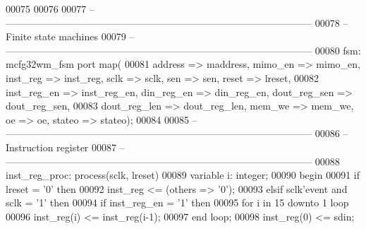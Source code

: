 \begin{DoxyCode}
00075 
00076 
00077 \textcolor{keyword}{    -- ---------------------------------------------------------------------------------------------}
00078 \textcolor{keyword}{    -- Finite state machines}
00079 \textcolor{keyword}{    -- ---------------------------------------------------------------------------------------------}
00080     fsm: mcfg32wm_fsm \textcolor{keywordflow}{port} \textcolor{keywordflow}{map}( 
00081         address => maddress, mimo_en => mimo_en, inst_reg => inst_reg, sclk => 
      sclk, sen => sen, reset => lreset,
00082         inst_reg_en => inst_reg_en, din_reg_en => din_reg_en, dout_reg_sen => 
      dout_reg_sen,
00083         dout_reg_len => dout_reg_len, mem_we => mem_we, oe => oe, stateo => 
      stateo\textcolor{vhdlchar}{)};
00084         
00085 \textcolor{keyword}{    -- ---------------------------------------------------------------------------------------------}
00086 \textcolor{keyword}{    -- Instruction register}
00087 \textcolor{keyword}{    -- ---------------------------------------------------------------------------------------------}
00088     inst\_reg\_proc: \textcolor{keywordflow}{process}(sclk, lreset)
00089         \textcolor{keywordflow}{variable} \textcolor{vhdlchar}{i}\textcolor{vhdlchar}{:} \textcolor{comment}{integer};
00090 \textcolor{vhdlkeyword}{    begin}
00091         \textcolor{keywordflow}{if} \textcolor{vhdlchar}{lreset} \textcolor{vhdlchar}{=} \textcolor{vhdlchar}{'}\textcolor{vhdllogic}{}\textcolor{vhdllogic}{0}\textcolor{vhdlchar}{'} \textcolor{keywordflow}{then}
00092             inst\_reg <= (\textcolor{keywordflow}{others} => '0');
00093         \textcolor{keywordflow}{elsif} \textcolor{vhdlchar}{sclk}\textcolor{vhdlchar}{'}\textcolor{vhdlkeyword}{event} \textcolor{keywordflow}{and} \textcolor{vhdlchar}{sclk} \textcolor{vhdlchar}{=} \textcolor{vhdlchar}{'}\textcolor{vhdllogic}{}\textcolor{vhdllogic}{1}\textcolor{vhdlchar}{'} \textcolor{keywordflow}{then}
00094             \textcolor{keywordflow}{if} \textcolor{vhdlchar}{inst_reg_en} \textcolor{vhdlchar}{=} \textcolor{vhdlchar}{'}\textcolor{vhdllogic}{}\textcolor{vhdllogic}{1}\textcolor{vhdlchar}{'} \textcolor{keywordflow}{then}
00095                 \textcolor{keywordflow}{for} \textcolor{vhdlchar}{i} \textcolor{keywordflow}{in} \textcolor{vhdllogic}{}\textcolor{vhdllogic}{15} \textcolor{keywordflow}{downto} \textcolor{vhdllogic}{}\textcolor{vhdllogic}{1} \textcolor{keywordflow}{loop}
00096                     inst\_reg(i) <= inst\_reg(i-1);
00097                 \textcolor{keywordflow}{end} \textcolor{keywordflow}{loop};
00098                 inst\_reg(\textcolor{vhdllogic}{0}) <= sdin;

\end{DoxyCode}
